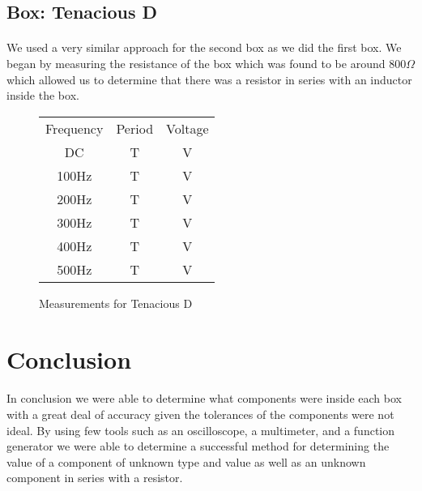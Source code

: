 \documentclass{article}
\begin{document}
\subsection*{Box: Tenacious D}
\paragraph{}
We used a very similar approach for the second box as we did the first box. We
began by measuring the resistance of the box which was found to be around
$800\Omega$ which allowed us to determine that there was a resistor in series
with an inductor inside the box.



\begin{figure}[!h]
\caption{Measurements for Tenacious D}
\begin{center}
\begin{tabular}{|c|c|c|}
\hline
Frequency & Period & Voltage\\
DC & T & V\\
\hline
100Hz & T & V\\
\hline
200Hz & T & V\\
\hline
300Hz & T & V\\
\hline
400Hz & T & V\\
\hline
500Hz & T & V\\
\hline
\end{tabular}
\end{center}
\end{figure}



\section*{Conclusion}
\paragraph{}
In conclusion we were able to determine what components were inside each box with
a great deal of accuracy given the tolerances of the components were not ideal. By
using few tools such as an oscilloscope, a multimeter, and a function generator we
were able to determine a successful method for determining the value of a component
of unknown type and value as well as an unknown component in series with a resistor.

\end{document}
